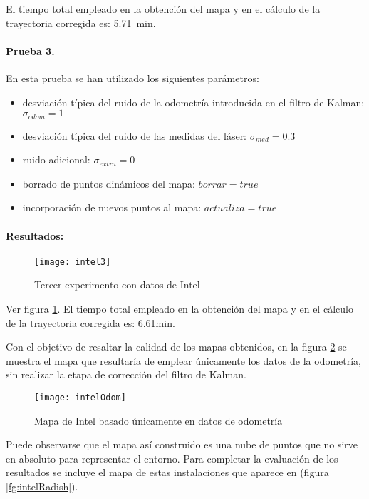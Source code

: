 El tiempo total empleado en la obtención del mapa y en el cálculo de la trayectoria corregida es: 5.71~min.

\paragraph{Prueba 3.}
En esta prueba se han utilizado los siguientes parámetros:%
\begin{itemize}
  \item desviación típica del ruido de la odometría introducida en el filtro de Kalman: $\sigma_{odom} = 1$
  \item desviación típica del ruido de las medidas del láser: $\sigma_{med} = 0.3$
  \item ruido adicional: $\sigma_{extra} = 0$
  \item borrado de puntos dinámicos del mapa: $borrar = true$
  \item incorporación de nuevos puntos al mapa: $actualiza = true$
\end{itemize}

\paragraph{Resultados:}

\begin{figure}[hbtp]
  \centering\texttt{[image: intel3]}\\
  \caption{Tercer experimento con datos de Intel}\label{fg:intel3}
\end{figure}

Ver figura \ref{fg:intel3}. El tiempo total empleado en la obtención del mapa y en el cálculo de la trayectoria corregida es: 6.61min.

\vspace{0.2cm}
Con el objetivo de resaltar la calidad de los mapas obtenidos, en la figura \ref{fg:intelOdom} se muestra el mapa que resultaría de emplear únicamente los datos de la odometría, sin realizar la etapa de corrección del filtro de Kalman.

\begin{figure}[hbtp]
  \centering\texttt{[image: intelOdom]}\\
  \caption{Mapa de Intel basado únicamente en datos de odometría}\label{fg:intelOdom}
\end{figure}

\vspace{0.8cm}
Puede observarse que el mapa así construido es una nube de puntos que no sirve en absoluto para representar el entorno.
Para completar la evaluación de los resultados se incluye el mapa de estas instalaciones que aparece en \cite{Radish} (figura \ref{fg:intelRadish}).

